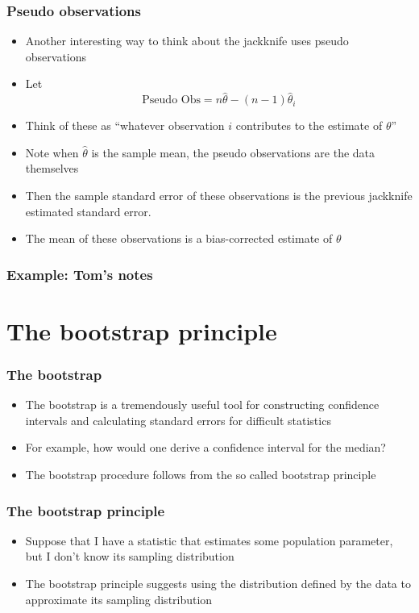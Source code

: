 \documentclass[aspectratio=169]{beamer}
\begin{document}
\begin{frame}\frametitle{Pseudo observations}
  \begin{itemize}
    \item Another interesting way to think about the jackknife uses pseudo observations
    \item Let
      $$
      \mbox{Pseudo Obs} = n \hat \theta - (n - 1) \hat \theta_{i}
      $$
    \item Think of these as ``whatever observation $i$ contributes to the estimate of $\theta$''
    \item Note when $\hat \theta$ is the sample mean, the pseudo observations are the data themselves
    \item Then the sample standard error of these observations is the previous jackknife estimated standard error.
    \item The mean of these observations is a bias-corrected estimate of $\theta$
  \end{itemize}
\end{frame}

\begin{frame}\frametitle{Example: Tom's notes}
\end{frame}

\section{The bootstrap principle}
\begin{frame}\frametitle{The bootstrap}
\begin{itemize}
\item The bootstrap is a tremendously useful tool for constructing
  confidence intervals and calculating standard errors for difficult
  statistics
\item For example, how would one derive a confidence interval for
  the median?
\item The bootstrap procedure follows from the so called bootstrap
  principle
\end{itemize}
\end{frame}

\begin{frame}\frametitle{The bootstrap principle}
\begin{itemize}
\item Suppose that I have a statistic that estimates some population
  parameter, but I don't know its sampling distribution
\item The bootstrap principle suggests using the distribution defined
  by the data to approximate its sampling distribution
\end{itemize}
\end{frame}
\end{document}
